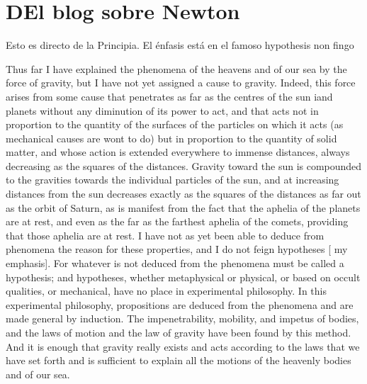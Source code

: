 \section{DEl blog sobre Newton}

Esto es directo de la Principia. El énfasis está en el famoso hypothesis non fingo

Thus far I have explained the phenomena of the heavens and of our sea by the force of
gravity, but I have not yet assigned a cause to gravity. Indeed, this force arises
from some cause that penetrates as far as the centres of the sun iand planets without
any diminution of its power to act, and that acts not in proportion to the quantity
of the surfaces of the particles on which it acts (as mechanical causes are wont to
do) but in proportion to the quantity of solid matter, and whose action is extended
everywhere to immense distances, always decreasing as the squares of the distances.
Gravity toward the sun is compounded to the gravities towards the individual
particles of the sun, and at increasing distances from the sun decreases exactly as
the squares of the distances as far out as the orbit of Saturn, as is manifest from
the fact that the aphelia of the planets are at rest, and even as the far as the
farthest aphelia of the comets, providing that those aphelia are at rest. I have not
as yet been able to deduce from phenomena the reason for these properties, and I do
not feign hypotheses [ my emphasis]. For whatever is not deduced from the phenomena
must be called a hypothesis; and hypotheses, whether metaphysical or physical, or
based on occult qualities, or mechanical, have no place in experimental philosophy.
In this experimental philosophy, propositions are deduced from the phenomena and are
made general by induction. The impenetrability, mobility, and impetus of bodies, and
the laws of motion and the law of gravity have been found by this method. And it is
enough that gravity really exists and acts according to the laws that we have set
forth and is sufficient to explain all the motions of the heavenly bodies and of our
sea. 



